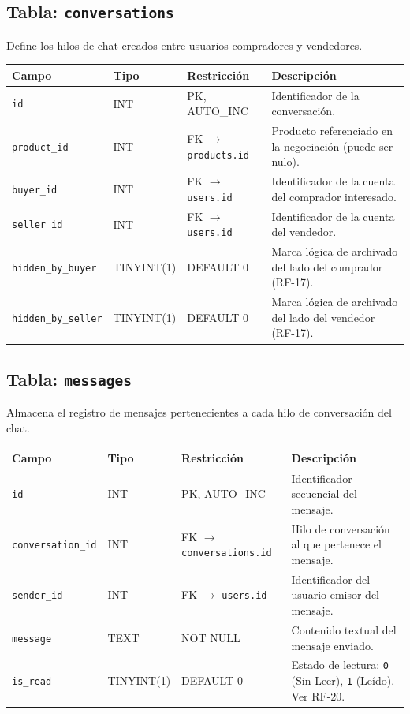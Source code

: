 \documentclass[11pt,a4paper]{report}
\begin{document}
\subsection{Tabla: \texttt{conversations}}
Define los hilos de chat creados entre usuarios compradores y vendedores.
\begin{table}[H]
\centering
\begin{tabularx}{\textwidth}{|l|l|l|L|}
\hline
{}\textbf{Campo} & \textbf{Tipo} & \textbf{Restricción} & \textbf{Descripción} \\ \hline
\texttt{id} & INT & PK, AUTO\_INC & Identificador de la conversación. \\ \hline
\texttt{product\_id} & INT & FK $\rightarrow$ \texttt{products.id} & Producto referenciado en la negociación (puede ser nulo). \\ \hline
\texttt{buyer\_id} & INT & FK $\rightarrow$ \texttt{users.id} & Identificador de la cuenta del comprador interesado. \\ \hline
\texttt{seller\_id} & INT & FK $\rightarrow$ \texttt{users.id} & Identificador de la cuenta del vendedor. \\ \hline
\texttt{hidden\_by\_buyer} & TINYINT(1) & DEFAULT 0 & Marca lógica de archivado del lado del comprador (RF-17). \\ \hline
\texttt{hidden\_by\_seller} & TINYINT(1) & DEFAULT 0 & Marca lógica de archivado del lado del vendedor (RF-17). \\ \hline
\end{tabularx}
\end{table}

\subsection{Tabla: \texttt{messages}}
Almacena el registro de mensajes pertenecientes a cada hilo de conversación del chat.
\begin{table}[H]
\centering
\begin{tabularx}{\textwidth}{|l|l|l|L|}
\hline
{}\textbf{Campo} & \textbf{Tipo} & \textbf{Restricción} & \textbf{Descripción} \\ \hline
\texttt{id} & INT & PK, AUTO\_INC & Identificador secuencial del mensaje. \\ \hline
\texttt{conversation\_id} & INT & FK $\rightarrow$ \texttt{conversations.id} & Hilo de conversación al que pertenece el mensaje. \\ \hline
\texttt{sender\_id} & INT & FK $\rightarrow$ \texttt{users.id} & Identificador del usuario emisor del mensaje. \\ \hline
\texttt{message} & TEXT & NOT NULL & Contenido textual del mensaje enviado. \\ \hline
\texttt{is\_read} & TINYINT(1) & DEFAULT 0 & Estado de lectura: \texttt{0} (Sin Leer), \texttt{1} (Leído). Ver RF-20. \\ \hline
\end{tabularx}
\end{table}
\end{document}
